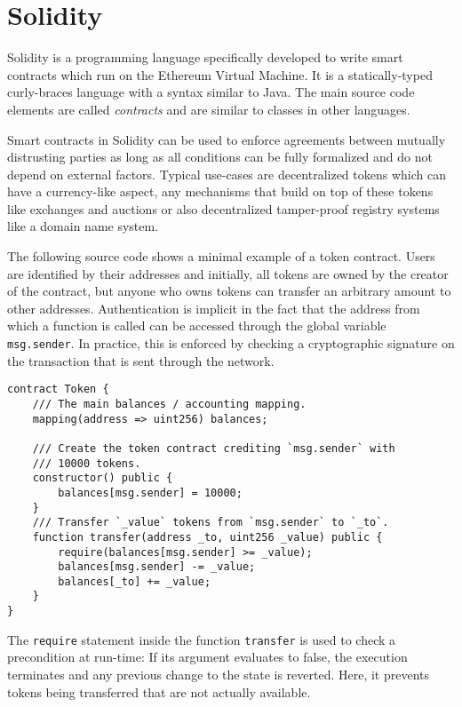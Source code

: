\section{Solidity}
\label{section:solidity}

Solidity is a programming language specifically developed to write smart contracts
which run on the Ethereum Virtual Machine. It is a statically-typed curly-braces
language with a syntax similar to Java. The main source code elements are
called \emph{contracts} and are similar to classes in other languages.

Smart contracts in Solidity can be used to enforce agreements between
mutually distrusting parties as long as all conditions can be fully formalized
and do not depend on external factors. Typical use-cases are decentralized
tokens which can have a currency-like aspect, any mechanisms that build
on top of these tokens like exchanges and auctions or also decentralized
tamper-proof registry systems like a domain name system.

The following source code shows a minimal example of a token contract.
Users are identified by their addresses and initially, all tokens are
owned by the creator of the contract, but
anyone who owns tokens can transfer an arbitrary amount to other addresses.
Authentication is implicit in the fact that the address from which
a function is called can be accessed through the global variable
\texttt{msg.sender}. In practice, this is enforced by checking a
cryptographic signature on the transaction that is sent through the network.

\begin{verbatim}
contract Token {
    /// The main balances / accounting mapping.
    mapping(address => uint256) balances;

    /// Create the token contract crediting `msg.sender` with
    /// 10000 tokens.
    constructor() public {
        balances[msg.sender] = 10000;
    }
    /// Transfer `_value` tokens from `msg.sender` to `_to`.
    function transfer(address _to, uint256 _value) public {
        require(balances[msg.sender] >= _value);
        balances[msg.sender] -= _value;
        balances[_to] += _value;
    }
}
\end{verbatim}

The \texttt{require} statement inside the function \texttt{transfer} is used
to check a precondition at run-time: If its argument evaluates to false,
the execution terminates and any previous change to the state is reverted.
Here, it prevents tokens being transferred that are not actually available.

